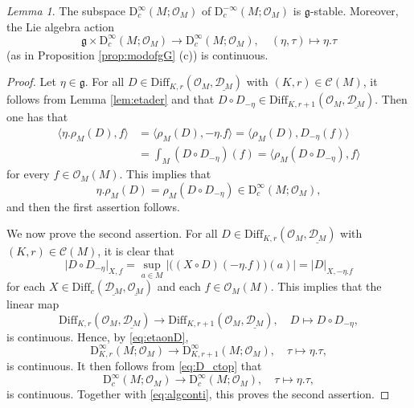 \documentclass[12pt, a4paper]{amsart}
\newcommand{\CO}{{\mathcal {O}}}
\newcommand{\RD}{{\mathrm {D}}}
\newcommand{\g}{\mathfrak g}
\newcommand{\abs}[1]{\lvert#1\rvert}
\newcommand{\be}{\begin {equation}}
\newcommand{\ee}{\end {equation}}
\theoremstyle{Theorem}
\theoremstyle{Theorem}
\theoremstyle{Theorem}
\theoremstyle{Theorem}
\theoremstyle{Plain}
\theoremstyle{remark}
\theoremstyle{remark}
\theoremstyle{Definition}
\newtheorem{lemd}[dfn]{Lemma}
\numberwithin{equation}{section}
\begin{document}
\begin{lemd}\label{lem:GOMsm}
	    The subspace $\RD^{\infty}_c(M;\CO_M)$ of $\RD^{-\infty}_c(M;\CO_M)$ is $\g$-stable. Moreover, the Lie algebra action 
\be\label{eq:etaonDc} \g\times \RD^{\infty}_c(M;\CO_M) \rightarrow \RD^{\infty}_c(M;\CO_M), \quad (\eta,\tau)\mapsto \eta.\tau\ee (as in Proposition \ref{prop:modofgG} (c)) is continuous.
\end{lemd}
\begin{proof}
Let $\eta\in \g$. 
For all $D\in \mathrm{Diff}_{K,r} (\CO_M,\underline{\mathcal{D}_M})$ with $(K,r)\in \mathcal{C}(M)$, it follows from  Lemma \ref{lem:etader} and \cite[Proposition 3.8]{CSW1} that $D\circ D_{-\eta}\in \mathrm{Diff}_{K,r+1}(\CO_M,\underline{\mathcal{D}_{M}})$. 
Then one has that \[
\begin{aligned}
\langle \eta.\rho_M(D),f \rangle
&= \langle \rho_M(D), -\eta. f \rangle
 = \langle \rho_M(D), D_{-\eta}(f) \rangle \\
&= \int_M (D\circ D_{-\eta})(f)
 = \langle \rho_M(D\circ D_{-\eta}), f \rangle 
\end{aligned}
\] for every $f\in \CO_M(M)$. 
This implies that  \be\label{eq:etaonD} \eta.\rho_M(D)=\rho_M(D\circ D_{-\eta})\in \RD^{\infty}_c(M;\CO_M),\ee and then the first assertion follows.

We now prove the second assertion. For all $D\in \mathrm{Diff}_{K,r} (\CO_M,\underline{\mathcal{D}_M})$ with $(K,r)\in \mathcal{C}(M)$, it is clear that 
\[
\abs{D\circ D_{-\eta}}_{X,f}=\sup_{a\in M}|\big((X\circ D)(-\eta.f)\big)(a)|=\abs{D}_{X,-\eta.f}
\]
for each $X\in \mathrm{Diff}_c(\underline{\mathcal{D}_M},\underline{\CO_M})$ and each $f\in \CO_M(M)$.  
This implies that the linear map
\[
\mathrm{Diff}_{K,r}(\CO_M,\underline{\mathcal{D}_M})
\rightarrow
\mathrm{Diff}_{K,r+1}(\CO_M,\underline{\mathcal{D}_M}),
\quad
D\mapsto D\circ D_{-\eta},
\]
is continuous. Hence, by \eqref{eq:etaonD},
\[
\RD^{\infty}_{K,r}(M;\CO_M)
\rightarrow
\RD^{\infty}_{K,r+1}(M;\CO_M),
\quad
\tau\mapsto\eta.\tau,
\]
is continuous. It then follows from \eqref{eq:D_ctop} that
\[
\RD^{\infty}_c(M;\CO_M)
\rightarrow
\RD^{\infty}_c(M;\CO_M),
\quad
\tau\mapsto\eta.\tau,
\]
is continuous. Together with \eqref{eq:algconti}, this proves the second assertion.
\end{proof}
\end{document}
